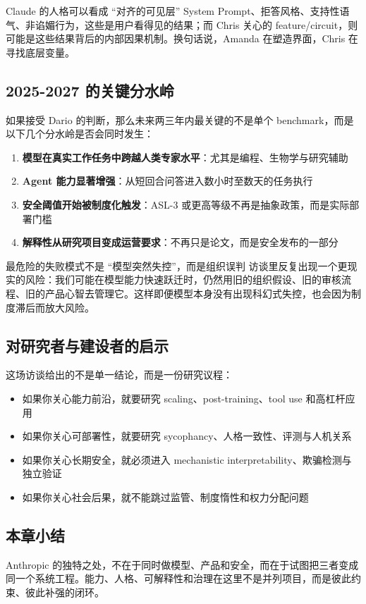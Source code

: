 \begin{knowledgebox}{Claude 的人格可以看成 ``对齐的可见层''}
System Prompt、拒答风格、支持性语气、非谄媚行为，这些是用户看得见的结果；而 Chris 关心的 feature/circuit，则可能是这些结果背后的内部因果机制。换句话说，Amanda 在塑造界面，Chris 在寻找底层变量。
\end{knowledgebox}

\subsection{2025-2027 的关键分水岭}

如果接受 Dario 的判断，那么未来两三年内最关键的不是单个 benchmark，而是以下几个分水岭是否会同时发生：

\begin{enumerate}
    \item \textbf{模型在真实工作任务中跨越人类专家水平}：尤其是编程、生物学与研究辅助
    \item \textbf{Agent 能力显著增强}：从短回合问答进入数小时至数天的任务执行
    \item \textbf{安全阈值开始被制度化触发}：ASL-3 或更高等级不再是抽象政策，而是实际部署门槛
    \item \textbf{解释性从研究项目变成运营要求}：不再只是论文，而是安全发布的一部分
\end{enumerate}

\begin{warningbox}{最危险的失败模式不是 ``模型突然失控''，而是组织误判}
访谈里反复出现一个更现实的风险：我们可能在模型能力快速跃迁时，仍然用旧的组织假设、旧的审核流程、旧的产品心智去管理它。这样即便模型本身没有出现科幻式失控，也会因为制度滞后而放大风险。
\end{warningbox}

\subsection{对研究者与建设者的启示}

这场访谈给出的不是单一结论，而是一份研究议程：

\begin{itemize}
    \item 如果你关心能力前沿，就要研究 scaling、post-training、tool use 和高杠杆应用
    \item 如果你关心可部署性，就要研究 sycophancy、人格一致性、评测与人机关系
    \item 如果你关心长期安全，就必须进入 mechanistic interpretability、欺骗检测与独立验证
    \item 如果你关心社会后果，就不能跳过监管、制度惰性和权力分配问题
\end{itemize}

\subsection{本章小结}

Anthropic 的独特之处，不在于同时做模型、产品和安全，而在于试图把三者变成同一个系统工程。能力、人格、可解释性和治理在这里不是并列项目，而是彼此约束、彼此补强的闭环。

